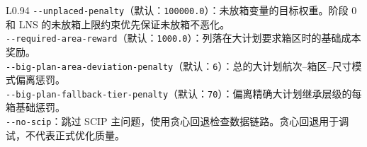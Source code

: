 \documentclass[UTF8,a4paper,11pt]{ctexart}
\newcommand{\code}[1]{\nolinkurl{#1}}
\begin{document}
\begin{longtable}{L{0.94\linewidth}}
\code{--unplaced-penalty}（默认：\code{100000.0}）：未放箱变量的目标权重。阶段 0 和 LNS 的未放箱上限约束优先保证未放箱不恶化。\\[0.25em]
\code{--required-area-reward}（默认：\code{1000.0}）：列落在大计划要求箱区时的基础成本奖励。\\[0.25em]
\code{--big-plan-area-deviation-penalty}（默认：\code{6}）：总的大计划航次--箱区--尺寸模式偏离惩罚。\\[0.25em]
\code{--big-plan-fallback-tier-penalty}（默认：\code{70}）：偏离精确大计划继承层级的每箱基础惩罚。\\[0.25em]
\code{--no-scip}：跳过 SCIP 主问题，使用贪心回退检查数据链路。贪心回退用于调试，不代表正式优化质量。\\
\bottomrule
\end{longtable}
\end{document}
